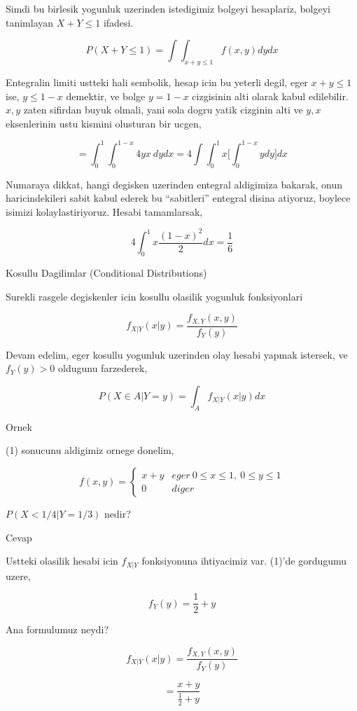 \documentclass[12pt,fleqn]{article}\usepackage{../common}
\begin{document}
Simdi bu birlesik yogunluk uzerinden istedigimiz bolgeyi hesaplariz,
bolgeyi tanimlayan $X+Y \le 1$ ifadesi. 

\[ P(X+Y \le 1) = 
\int \int_{x+y \le 1} f(x,y) dy dx
 \]

Entegralin limiti ustteki hali sembolik, hesap icin bu yeterli degil, eger
$x+y \le 1$ ise,  $y \le 1-x$ demektir, ve bolge $y = 1-x$ cizgisinin alti
olarak kabul edilebilir. $x,y$ zaten sifirdan buyuk olmali, yani sola dogru
yatik cizginin alti ve $y,x$ eksenlerinin ustu kismini olusturan bir ucgen,

\[ =
\int _{ 0}^{1} \int _{ 0}^{1-x} 4yx \ dy dx = 
4 \int \int _{ 0}^{1} x \bigg[ \int _{ 0}^{1-x} ydy \bigg] dx
 \]

Numaraya dikkat, hangi degisken uzerinden entegral aldigimiza bakarak, onun
haricindekileri sabit kabul ederek bu ``sabitleri'' entegral disina
atiyoruz, boylece isimizi kolaylastiriyoruz. Hesabi tamamlarsak, 

\[ 4 \int _{ 0}^{1} x \frac{ (1- x)^2}{2} dx = \frac{ 1}{6} \]

Kosullu Dagilimlar (Conditional Distributions)

Surekli rasgele degiskenler icin kosullu olasilik yogunluk fonksiyonlari 

\[ f_{X|Y}(x|y) = \frac{ f_{X,Y}(x,y)}{f_Y(y)} \]

Devam edelim, eger kosullu yogunluk uzerinden olay hesabi yapmak istersek,
ve  $f_Y(y) > 0$ oldugunu farzederek, 

\[ P(X \in A | Y = y) = \int_A f_{X|Y}(x|y) dx \]


Ornek 

(1) sonucunu aldigimiz ornege donelim,

\[ f(x,y) = 
\left\{ \begin{array}{ll}
x+y & eger \ 0 \le x \le 1, \ 0 \le y \le 1 \\
0 & diger
\end{array} \right.
 \]

$P(X < 1/4 | Y = 1/3)$ nedir? 

Cevap 

Ustteki olasilik hesabi icin $f_{X|Y}$ fonksiyonuna ihtiyacimiz var. (1)'de
gordugumu uzere, 

\[ f_Y(y) = \frac{ 1}{2} + y 
 \]
 
Ana formulumuz neydi? 

\[ f_{X|Y}(x|y) = \frac{ f_{X,Y}(x,y)}{f_Y(y)} \]

\[ = 
\frac{ x+y }{\frac{ 1}{2} + y}
 \]
\end{document}
